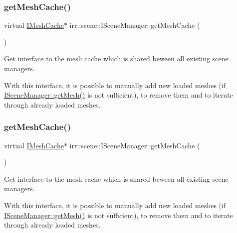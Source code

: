 \subsubsection{\texorpdfstring{get\+Mesh\+Cache()}{getMeshCache()}\hspace{0.1cm}{\footnotesize\ttfamily [1/2]}}
{\footnotesize\ttfamily virtual \hyperlink{classirr_1_1scene_1_1IMeshCache}{I\+Mesh\+Cache}$\ast$ irr\+::scene\+::\+I\+Scene\+Manager\+::get\+Mesh\+Cache (\begin{DoxyParamCaption}{ }\end{DoxyParamCaption})\hspace{0.3cm}{\ttfamily [pure virtual]}}



Get interface to the mesh cache which is shared beween all existing scene managers. 

With this interface, it is possible to manually add new loaded meshes (if \hyperlink{classirr_1_1scene_1_1ISceneManager_a63894c3f3d46cfc385116f1705935e03}{I\+Scene\+Manager\+::get\+Mesh()} is not sufficient), to remove them and to iterate through already loaded meshes. \mbox{\label{classirr_1_1scene_1_1ISceneManager_a45d89c816e33abe0e77eb063d7ce58a8}} 
\subsubsection{\texorpdfstring{get\+Mesh\+Cache()}{getMeshCache()}\hspace{0.1cm}{\footnotesize\ttfamily [2/2]}}
{\footnotesize\ttfamily virtual \hyperlink{classirr_1_1scene_1_1IMeshCache}{I\+Mesh\+Cache}$\ast$ irr\+::scene\+::\+I\+Scene\+Manager\+::get\+Mesh\+Cache (\begin{DoxyParamCaption}{ }\end{DoxyParamCaption})\hspace{0.3cm}{\ttfamily [pure virtual]}}



Get interface to the mesh cache which is shared beween all existing scene managers. 

With this interface, it is possible to manually add new loaded meshes (if \hyperlink{classirr_1_1scene_1_1ISceneManager_a63894c3f3d46cfc385116f1705935e03}{I\+Scene\+Manager\+::get\+Mesh()} is not sufficient), to remove them and to iterate through already loaded meshes. \mbox{\label{classirr_1_1scene_1_1ISceneManager_afabf244b50875a52eb42d5d375fa40d4}} 
